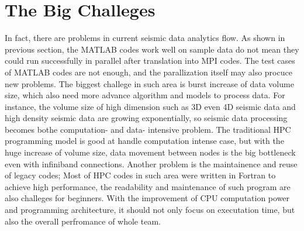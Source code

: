 \section{The Big Challeges}
In fact, there are problems in current seismic data analytics flow. As shown in previous section, the MATLAB codes work well on sample data do not mean they could run successfully in parallel after translation into MPI codes. The test cases of MATLAB codes are not enough, and the parallization itself may also procuce new problems. The biggest challege in such area is burst increase of data volume size, which also need more advance algorithm and models to process data. For instance, the volume size of high dimension such as 3D even 4D seismic data and high density seismic data are growing exponentially, so seismic data processing becomes bothe computation- and data- intensive problem.  The traditional HPC programming model is good at handle computation intense case, but with the huge increase of volume size, data movement between nodes is the big bottleneck even with infiniband connections. Another problem is the maintainence and reuse of legacy codes; Most of HPC codes in such area were written in Fortran to achieve high performance, the readability and maintenance of such program are also challeges for beginners. With the improvement of CPU computation power and programming architecture, it should not only focus on executation time, but also the overall perfromance of whole team. 


